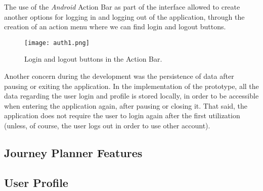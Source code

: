The use of the \emph{Android} Action Bar as part of the interface allowed to create another options for logging in and logging out of the application, through the creation of an action menu where we can find login and logout buttons.

\begin{figure}[h!]
  \begin{center}
    \leavevmode
    \texttt{[image: auth1.png]}
    \caption{Login and logout buttons in the Action Bar.}
    \label{fig:auth3}
  \end{center}
\end{figure}

Another concern during the development was the persistence of data after pausing or exiting the application. In the implementation of the prototype, all the data regarding the user login and profile is stored locally, in order to be accessible when entering the application again, after pausing or closing it. That said, the application does not require the user to login again after the first utilization (unless, of course, the user logs out in order to use other account).


\subsection{Journey Planner Features}\label{journeyplanner}

\subsection{User Profile}
